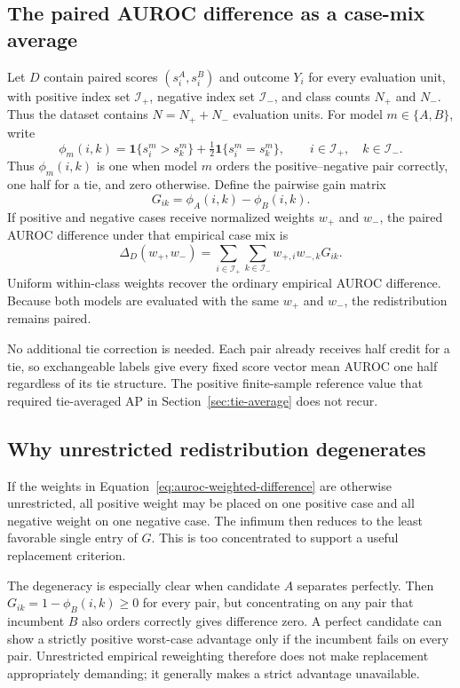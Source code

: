 \documentclass[11pt]{article}
\theoremstyle{remark}
\begin{document}
\subsection{The paired AUROC difference as a case-mix average}

Let $D$ contain paired scores $(s_i^A,s_i^B)$ and outcome $Y_i$ for every
evaluation unit, with positive index set $\mathcal I_+$, negative index set
$\mathcal I_-$, and class counts $N_+$ and $N_-$. Thus the dataset contains
$N=N_++N_-$ evaluation units. For model $m\in\{A,B\}$,
write
\[
\phi_m(i,k)
=
\mathbf 1\{s_i^m>s_k^m\}
+\tfrac12\mathbf 1\{s_i^m=s_k^m\},
\qquad i\in\mathcal I_+,\quad k\in\mathcal I_-.
\]
Thus $\phi_m(i,k)$ is one when model $m$ orders the positive--negative
pair correctly, one half for a tie, and zero otherwise. Define the pairwise
gain matrix
\[
G_{ik}=\phi_A(i,k)-\phi_B(i,k).
\]
If positive and negative cases receive normalized weights $w_+$ and $w_-$,
the paired AUROC difference under that empirical case mix is
\begin{equation}
\Delta_D(w_+,w_-)
=
\sum_{i\in\mathcal I_+}\sum_{k\in\mathcal I_-}
w_{+,i}w_{-,k}G_{ik}.
\label{eq:auroc-weighted-difference}
\end{equation}
Uniform within-class weights recover the ordinary empirical AUROC difference.
Because both models are evaluated with the same $w_+$ and $w_-$, the
redistribution remains paired.

No additional tie correction is needed. Each pair already receives half credit
for a tie, so exchangeable labels give every fixed score vector mean AUROC one
half regardless of its tie structure. The positive finite-sample reference
value that required tie-averaged AP in Section~\ref{sec:tie-average} does not
recur.

\subsection{Why unrestricted redistribution degenerates}

If the weights in Equation~\eqref{eq:auroc-weighted-difference} are otherwise
unrestricted, all positive weight may be placed on one positive case and all
negative weight on one negative case. The infimum then reduces to the least
favorable single entry of $G$. This is too concentrated to support a useful
replacement criterion.

The degeneracy is especially clear when candidate $A$ separates perfectly.
Then $G_{ik}=1-\phi_B(i,k)\geq0$ for every pair, but concentrating on any pair
that incumbent $B$ also orders correctly gives difference zero. A perfect
candidate can show a strictly positive worst-case advantage only if the
incumbent fails on every pair. Unrestricted empirical reweighting therefore
does not make replacement appropriately demanding; it generally makes a
strict advantage unavailable.
\end{document}
